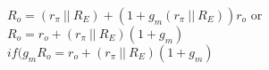 $ R_o = (r_\pi ~||~ R_E) + ( 1 + g_m (r_\pi ~||~ R_E) )r_o$ or \\
$ R_o = r_o + (r_\pi ~||~ R_E)( 1 + g_m  )$ \\
$ if ( g_m R_o = r_o + (r_\pi ~||~ R_E)( 1 + g_m  )$ \\

